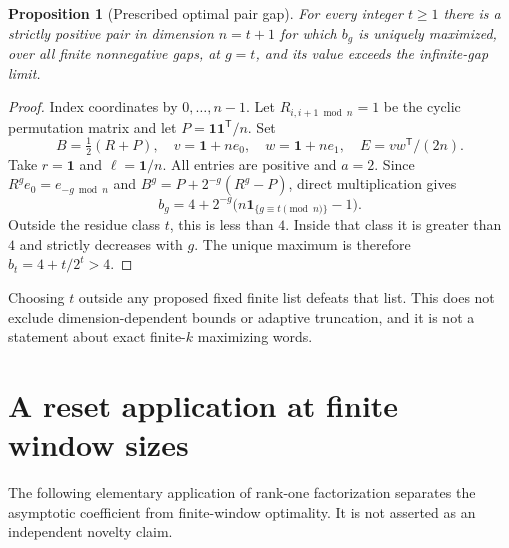 \documentclass[11pt,letterpaper]{article}
\newtheorem{proposition}[theorem]{Proposition}
\theoremstyle{remark}
\newcommand{\ones}{\mathbf 1}
\newcommand{\transpose}{^{\mathsf T}}
\begin{document}
\begin{proposition}[Prescribed optimal pair gap]\label{prop:gap}
For every integer $t\ge1$ there is a strictly positive pair in dimension
$n=t+1$ for which $b_g$ is uniquely maximized, over all finite nonnegative
gaps, at $g=t$, and its value exceeds the infinite-gap limit.
\end{proposition}
\begin{proof}
Index coordinates by $0,\ldots,n-1$. Let $R_{i,i+1\bmod n}=1$ be the
cyclic permutation matrix and let $P=\ones\ones\transpose/n$. Set
\[
 B=\tfrac12(R+P),\quad v=\ones+n e_0,\quad
 w=\ones+n e_1,\quad E=vw\transpose/(2n).
\]
Take $r=\ones$ and $\ell=\ones/n$. All entries are positive and
$a=2$. Since $R^g e_0=e_{-g\bmod n}$ and
$B^g=P+2^{-g}(R^g-P)$, direct multiplication gives
\[
 b_g=4+2^{-g}\bigl(n\mathbf1_{\{g\equiv t\pmod n\}}-1\bigr).
\]
Outside the residue class $t$, this is less than $4$. Inside that
class it is greater than $4$ and strictly decreases with $g$.
The unique maximum is therefore $b_t=4+t/2^t>4$.
\end{proof}

Choosing $t$ outside any proposed fixed finite list defeats that list.
This does not exclude dimension-dependent bounds or adaptive truncation,
and it is not a statement about exact finite-$k$ maximizing words.

\section{A reset application at finite window sizes}\label{sec:reset}

The following elementary application of rank-one factorization
\cite{ahmadi2012} separates the asymptotic coefficient from finite-window
optimality. It is not asserted as an independent novelty claim.
\end{document}
